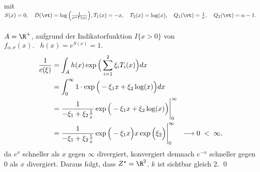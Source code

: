 \documentclass[12pt]{article}
\begin{document}
\begin{description}
{\begin{equation*}
\begin{split}
        \end{split}\end{equation*} mit \quad$S(x) = 0, \quad D(\vt) = \log\Big(\frac{1}{\sigma^{\alpha}\Gamma(\alpha)}\Big),\\ T_1(x) = -x, \quad T_2(x) = \log(x), \quad Q_1(\vt) =  \frac{1}{\sigma}, \quad Q_2(\vt) = \alpha - 1.$\\\\$A = \R^+$, aufgrund der Indikatorfunktion $I\{x > 0\}$ von $f_{\alpha,\sigma} (x). \;\;\; h(x) = e^{S(x)} = 1.$ 
        \begin{equation*}\begin{split}
                                {1 \over c(\xi)} &= \int_A h(x) \exp\Big(\sum_{i=1}^2 \xi_i T_i(x) \Big) dx 
                                \\&= \int_0^\infty 1\cdot \exp\Big(-\xi_1 x + \xi_2 \log(x)   \Big) dx 
                                \\&= \frac{1}{-\xi_1 +\xi_2 \frac{1}{x}} \exp\Big(-\xi_1 x + \xi_2 \log(x)   \Big) \Bigg|_0^\infty
                                 \\&= \frac{1}{-\xi_1 +\xi_2 \frac{1}{x}} \exp\Big(-\xi_1 x\Big) x \exp\Big(\xi_2 \Big) \Bigg|_0^\infty \quad \longrightarrow 0 \; < \; \infty,
        \end{split}\end{equation*} da $e^{x}$ schneller als $x$ gegen $\infty$ divergiert, konvergiert demnach $e^{-x}$ schneller gegen 0 als $x$ divergiert. Daraus folgt, dass $Z^\star = \R^2$.\; $k$ ist sichtbar gleich 2. \xtab\qed
        }
        \end{description}
\end{document}
